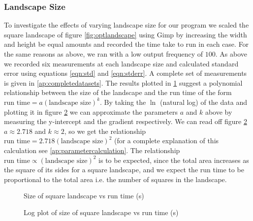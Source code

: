 \subsubsection{Landscape Size}
\label{subsub:landscapesize}
To investigate the effects of varying landscape size for our program we scaled the square landscape of figure \ref{fig:optlandscape} using Gimp by increasing the width and height be equal amounts and recorded the time take to run in each case. For the same reasons as above, we ran with a low output frequency of $100$. As above we recorded six measurements at each landscape size and calculated standard error using equations \ref{eqn:std} and \ref{eqn:stderr}. A complete set of measurements is given in \ref{ap:completedatasets}. The results plotted in \ref{fig:landscapesizegraph} suggest a polynomial relationship between the size of the landscape and the run time of the form $\text{run time} = a (\text{landscape size}) ^k$. By taking the $\ln$ (natural log) of the data and plotting it in figure \ref{fig:loglandscapesizegraph} we can approximate the parameters $a$ and $k$ above by measuring the y-intercept and the gradient respectively. We can read off figure \ref{fig:loglandscapesizegraph}  $a \approx 2.718$ and $k \approx 2$, so we get the relationship $\text{run time} = 2.718(\text{landscape size}) ^2$ (for a complete explanation of this calculation see \ref{ap:parametercalculation}. The relationship $\text{run time} \propto (\text{landscape size}) ^2$ is to be expected, since the total area increases as the square of its sides for a square landscape, and we expect the run time to be proportional to the total area i.e. the number of squares in the landscape.
\begin{figure}
\centering
{}
\caption{Size of square landscape vs run time (s)}
\label{fig:landscapesizegraph}
\end{figure}

\begin{figure}
\centering
{}
\caption{Log plot of size of square landscape vs run time (s)}
\label{fig:loglandscapesizegraph}
\end{figure}

